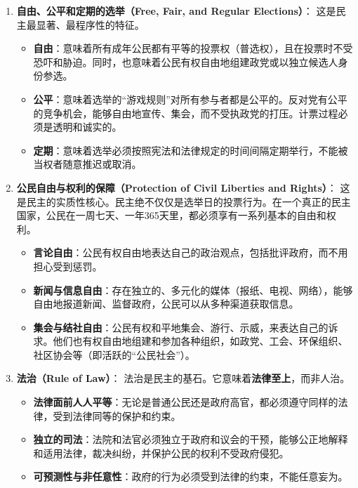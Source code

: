 \begin{enumerate}
    \item \textbf{自由、公平和定期的选举（Free, Fair, and Regular Elections）}：
    这是民主最显著、最程序性的特征。
    \begin{itemize}
        \item \textbf{自由}：意味着所有成年公民都有平等的投票权（普选权），且在投票时不受恐吓和胁迫。同时，也意味着公民有权自由地组建政党或以独立候选人身份参选。
        \item \textbf{公平}：意味着选举的“游戏规则”对所有参与者都是公平的。反对党有公平的竞争机会，能够自由地宣传、集会，而不受执政党的打压。计票过程必须是透明和诚实的。
        \item \textbf{定期}：意味着选举必须按照宪法和法律规定的时间间隔定期举行，不能被当权者随意推迟或取消。
    \end{itemize}

    \item \textbf{公民自由与权利的保障（Protection of Civil Liberties and Rights）}：
    这是民主的实质性核心。民主绝不仅仅是选举日的投票行为。在一个真正的民主国家，公民在一周七天、一年365天里，都必须享有一系列基本的自由和权利。
    \begin{itemize}
        \item \textbf{言论自由}：公民有权自由地表达自己的政治观点，包括批评政府，而不用担心受到惩罚。
        \item \textbf{新闻与信息自由}：存在独立的、多元化的媒体（报纸、电视、网络），能够自由地报道新闻、监督政府，公民可以从多种渠道获取信息。
        \item \textbf{集会与结社自由}：公民有权和平地集会、游行、示威，来表达自己的诉求。他们也有权自由地组建和参加各种组织，如政党、工会、环保组织、社区协会等（即活跃的“公民社会”）。
    \end{itemize}

    \item \textbf{法治（Rule of Law）}：
    法治是民主的基石。它意味着\textbf{法律至上}，而非人治。
    \begin{itemize}
        \item \textbf{法律面前人人平等}：无论是普通公民还是政府高官，都必须遵守同样的法律，受到法律同等的保护和约束。
        \item \textbf{独立的司法}：法院和法官必须独立于政府和议会的干预，能够公正地解释和适用法律，裁决纠纷，并保护公民的权利不受政府侵犯。
        \item \textbf{可预测性与非任意性}：政府的行为必须受到法律的约束，不能任意妄为。
    \end{itemize}


\end{enumerate}
